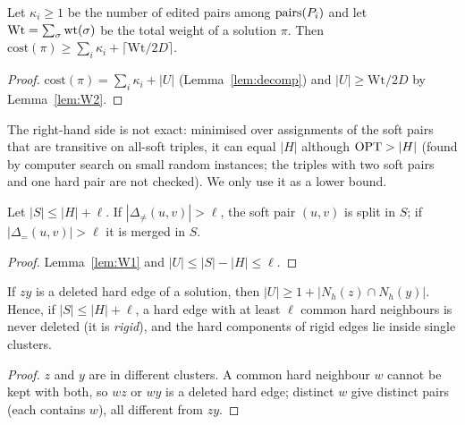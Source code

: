 \begin{corollary}\label{cor:LB}
Let $\kappa_i\ge1$ be the number of edited pairs among $\mathrm{pairs}(P_i)$ and let $\mathrm{Wt}=\sum_{\sigma}\mathrm{wt}(\sigma)$ be the total weight of a solution $\pi$. Then $\mathrm{cost}(\pi)\ge\sum_i\kappa_i+\lceil \mathrm{Wt}/2D\rceil$.
\end{corollary}
\begin{proof}
$\mathrm{cost}(\pi)=\sum_i\kappa_i+|U|$ (Lemma~\ref{lem:decomp}) and $|U|\ge \mathrm{Wt}/2D$ by Lemma~\ref{lem:W2}.
\end{proof}
The right-hand side is not exact: minimised over assignments of the soft pairs that are transitive on all-soft triples, it can equal $|H|$ although $\mathrm{OPT}>|H|$ (found by computer search on small random instances; the triples with two soft pairs and one hard pair are not checked). We only use it as a lower bound.

\begin{lemma}\label{lem:prune}
Let $|S|\le|H|+\ell$. If $|\Delta_{\neq}(u,v)|>\ell$, the soft pair $(u,v)$ is split in $S$; if $|\Delta_{=}(u,v)|>\ell$ it is merged in $S$.
\end{lemma}
\begin{proof}
Lemma~\ref{lem:W1} and $|U|\le|S|-|H|\le\ell$.
\end{proof}

\begin{lemma}\label{lem:DEL}
If $zy$ is a deleted hard edge of a solution, then $|U|\ge1+|N_h(z)\cap N_h(y)|$. Hence, if $|S|\le|H|+\ell$, a hard edge with at least $\ell$ common hard neighbours is never deleted (it is \emph{rigid}), and the hard components of rigid edges lie inside single clusters.
\end{lemma}
\begin{proof}
$z$ and $y$ are in different clusters. A common hard neighbour $w$ cannot be kept with both, so $wz$ or $wy$ is a deleted hard edge; distinct $w$ give distinct pairs (each contains $w$), all different from $zy$.
\end{proof}

